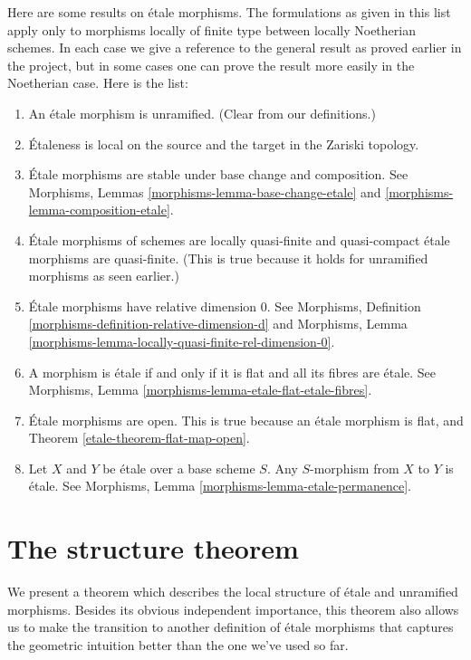 Here are some results on \'etale morphisms.
The formulations as given in this list apply only to
morphisms locally of finite type between locally Noetherian schemes.
In each case we give a reference to the general result as
proved earlier in the project, but in some cases one can
prove the result more easily in the Noetherian case.
Here is the list:
\begin{enumerate}
\item An \'etale morphism is unramified. (Clear from our definitions.)
\item \'Etaleness is local on the source and the target in the Zariski
topology.
\item \'Etale morphisms are stable under base change and composition.
See Morphisms, Lemmas \ref{morphisms-lemma-base-change-etale}
and \ref{morphisms-lemma-composition-etale}.
\item \'Etale morphisms of schemes are locally quasi-finite
and quasi-compact \'etale morphisms are quasi-finite. (This is
true because it holds for unramified morphisms as seen earlier.)
\item \'Etale morphisms have relative dimension $0$. See
Morphisms, Definition \ref{morphisms-definition-relative-dimension-d}
and
Morphisms, Lemma \ref{morphisms-lemma-locally-quasi-finite-rel-dimension-0}.
\item A morphism is \'etale if and only if it is flat and
all its fibres are \'etale. See
Morphisms, Lemma \ref{morphisms-lemma-etale-flat-etale-fibres}.
\item \'Etale morphisms are open. This is true because an \'etale
morphism is flat, and Theorem \ref{etale-theorem-flat-map-open}.
\item Let $X$ and $Y$ be \'etale over a base scheme $S$.
Any $S$-morphism from $X$ to $Y$ is \'etale.
See Morphisms, Lemma \ref{morphisms-lemma-etale-permanence}.
\end{enumerate}

\section{The structure theorem}
\label{etale-section-structure-etale-map}
We present a theorem which describes the local structure of \'etale
and unramified morphisms. Besides its obvious independent importance,
this theorem also allows us to make the transition to another
definition of \'etale morphisms that captures the geometric intuition better
than the one we've used so far.

